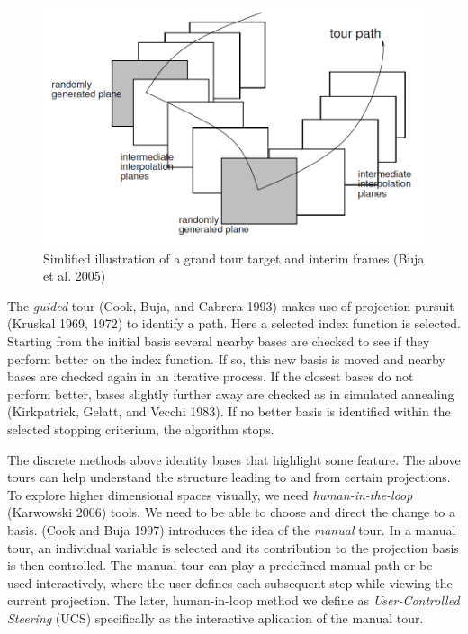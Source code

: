 \documentclass[
  11,
]{article}
\begin{document}
\begin{figure}[h]

{\centering \includegraphics[width=0.8\linewidth,]{figures/buja05fig} 

}

\caption{Simlified illustration of a grand tour target and interim frames  (Buja et al. 2005)}\label{fig:grandFrames}
\end{figure}

The \emph{guided} tour (Cook, Buja, and Cabrera 1993) makes use of projection pursuit (Kruskal 1969, 1972) to identify a path. Here a selected index function is selected. Starting from the initial basis several nearby bases are checked to see if they perform better on the index function. If so, this new basis is moved and nearby bases are checked again in an iterative process. If the closest bases do not perform better, bases slightly further away are checked as in simulated annealing (Kirkpatrick, Gelatt, and Vecchi 1983). If no better basis is identified within the selected stopping criterium, the algorithm stops.

The discrete methods above identity bases that highlight some feature. The above tours can help understand the structure leading to and from certain projections. To explore higher dimensional spaces visually, we need \emph{human-in-the-loop} (Karwowski 2006) tools. We need to be able to choose and direct the change to a basis. (Cook and Buja 1997) introduces the idea of the \emph{manual} tour. In a manual tour, an individual variable is selected and its contribution to the projection basis is then controlled. The manual tour can play a predefined manual path or be used interactively, where the user defines each subsequent step while viewing the current projection. The later, human-in-loop method we define as \emph{User-Controlled Steering} (UCS) specifically as the interactive aplication of the manual tour.
\end{document}
